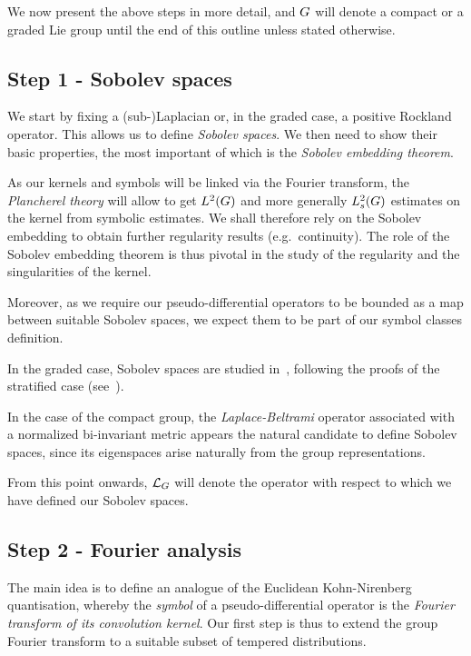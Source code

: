 We now present the above steps in more detail,
and $G$ will denote a compact or a graded Lie group until the end of this outline
unless stated otherwise.

\subsection*{Step 1 - Sobolev spaces}

We start by fixing a (sub-)Laplacian or, in the graded case, a positive Rockland operator.
This allows us to define \emph{Sobolev spaces}.
We then need to show their basic properties,
the most important of which is the \emph{Sobolev embedding theorem}.

As our kernels and symbols will be linked via the Fourier transform,
the \emph{Plancherel theory} will allow to get ${L^{2} (G)}$ and more generally $L^2_{s}(G)$ estimates on the kernel from symbolic estimates.
We shall therefore rely on the Sobolev embedding to obtain further regularity results (e.g.~continuity).
The role of the Sobolev embedding theorem is thus pivotal in the study of the regularity and the singularities of the kernel.

Moreover,
as we require our pseudo-differential operators to be bounded as a map between suitable Sobolev spaces,
we expect them to be part of our symbol classes definition.

In the graded case,
Sobolev spaces are studied in~\cite[Chapter 4]{FischerRuzhansky16},
following the proofs of the stratified case (see~\cite{Folland75}).

In the case of the compact group,
the \emph{Laplace-Beltrami} operator associated with a normalized bi-invariant metric appears the natural candidate to define Sobolev spaces,
since its eigenspaces arise naturally from the group representations.

From this point onwards,
${\mathcal{L}_{G}}$ will denote the operator with respect to which we have defined our Sobolev spaces.

\subsection*{Step 2 - Fourier analysis}

The main idea is to define an analogue of the Euclidean Kohn-Nirenberg quantisation,
whereby the \emph{symbol} of a pseudo-differential operator is the \emph{Fourier transform of its convolution kernel}.
Our first step is thus to extend the group Fourier transform to a suitable subset of tempered distributions.

